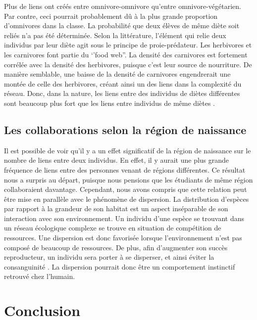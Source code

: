 \documentclass[twoside,twocolumn]{article}
\begin{document}
Plus de liens ont créés entre omnivore-omnivore qu'entre omnivore-végétarien. Par contre, ceci pourrait probablement dû à la plus grande proportion d'omnivores dans la classe. La probabilité que deux élèves de même diète soit reliés n'a pas été déterminée. Selon la littérature, l'élément qui relie deux individus par leur diète agit sous le principe de proie-prédateur. Les herbivores et les carnivores font partie du ‘'food web''. La densité des carnivores est fortement corrélée avec la densité des herbivores, puisque c'est leur source de nourriture. De manière semblable, une baisse de la densité de carnivores engendrerait une montée de celle des herbivores, créant ainsi un des liens dans la complexité du réseau. Donc, dans la nature, les liens entre des individus de diètes différentes sont beaucoup plus fort que les liens entre individus de même diètes \citep{paine1980food}.


\subsection{Les collaborations selon la région de naissance}

Il est possible de voir qu'il y a un effet significatif de la région de naissance sur le nombre de liens entre deux individus. En effet, il y aurait une plus grande fréquence de liens entre des personnes venant de régions différentes. Ce résultat nous a surpris au départ, puisque nous pensions que les étudiants de même région collaboraient davantage. Cependant, nous avons compris que cette relation peut être mise en parallèle avec le phénomène de dispersion. La distribution d'espèces par rapport à la grandeur de son habitat est un aspect inséparable de son interaction avec son environnement. Un individu d'une espèce se trouvant dans un réseau écologique complexe se trouve en situation de compétition de ressources. Une dispersion est donc favorisée lorsque l'environnement n'est pas composé de beaucoup de ressources. De plus, afin d'augmenter son succès reproducteur, un individu sera porter à se disperser, et ainsi éviter la consanguinité \citep{levin1974dispersion}. La dispersion pourrait donc être un comportement instinctif  retrouvé chez l'humain.



\section{Conclusion}
\end{document}
